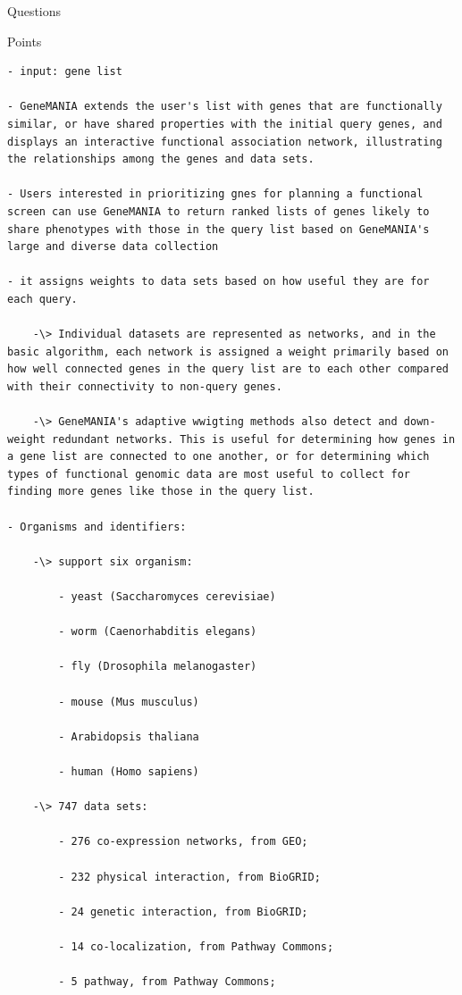 \documentclass[
]{book}
\begin{document}
Questions

Points

\begin{verbatim}
- input: gene list

- GeneMANIA extends the user's list with genes that are functionally similar, or have shared properties with the initial query genes, and displays an interactive functional association network, illustrating the relationships among the genes and data sets.

- Users interested in prioritizing gnes for planning a functional screen can use GeneMANIA to return ranked lists of genes likely to share phenotypes with those in the query list based on GeneMANIA's large and diverse data collection

- it assigns weights to data sets based on how useful they are for each query.

    -\> Individual datasets are represented as networks, and in the basic algorithm, each network is assigned a weight primarily based on how well connected genes in the query list are to each other compared with their connectivity to non-query genes.

    -\> GeneMANIA's adaptive wwigting methods also detect and down-weight redundant networks. This is useful for determining how genes in a gene list are connected to one another, or for determining which types of functional genomic data are most useful to collect for finding more genes like those in the query list.

- Organisms and identifiers:

    -\> support six organism:

        - yeast (Saccharomyces cerevisiae)

        - worm (Caenorhabditis elegans)

        - fly (Drosophila melanogaster)

        - mouse (Mus musculus)

        - Arabidopsis thaliana

        - human (Homo sapiens)

    -\> 747 data sets:

        - 276 co-expression networks, from GEO;

        - 232 physical interaction, from BioGRID;

        - 24 genetic interaction, from BioGRID;

        - 14 co-localization, from Pathway Commons;

        - 5 pathway, from Pathway Commons;


\end{verbatim}
\end{document}

